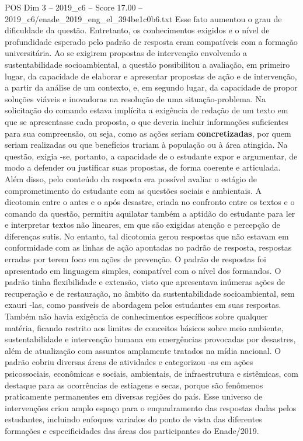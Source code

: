 \begin{textsample}{POS Dim 3 – 2019\_c6 – Score 17.00 – 2019\_c6/enade\_2019\_eng\_el\_394be1c0b6.txt}
Esse fato aumentou o grau de dificuldade da questão.
Entretanto, os conhecimentos exigidos e o nível de profundidade esperado pelo padrão de resposta eram compatíveis com a formação universitária.
Ao se exigirem propostas de intervenção envolvendo a sustentabilidade socioambiental, a questão possibilitou a avaliação, em primeiro lugar, da capacidade de elaborar e apresentar propostas de ação e de intervenção, a partir da análise de um contexto, e, em segundo lugar, da capacidade de propor soluções viáveis e inovadoras na resolução de uma situação-problema.
Na solicitação do comando estava implícita a exigência de redação de um texto em que se apresentasse cada proposta, o que deveria incluir informações suficientes para sua compreensão, ou seja, como as ações seriam \textbf{concretizadas}, por quem seriam realizadas ou que benefícios trariam à população ou à área atingida.
Na questão, exigia -se, portanto, a capacidade de o estudante expor e argumentar, de modo a defender ou justificar suas propostas, de forma coerente e articulada.
Além disso, pelo conteúdo da resposta era possível avaliar o estágio de comprometimento do estudante com as questões sociais e ambientais.
A dicotomia entre o antes e o após desastre, criada no confronto entre os textos e o comando da questão, permitiu aquilatar também a aptidão do estudante para ler e interpretar textos não lineares, em que são exigidas atenção e percepção de diferenças sutis.
No entanto, tal dicotomia gerou respostas que não estavam em conformidade com as linhas de ação apontadas no padrão de resposta, respostas erradas por terem foco em ações de prevenção.
O padrão de respostas foi apresentado em linguagem simples, compatível com o nível dos formandos.
O padrão tinha flexibilidade e extensão, visto que apresentava inúmeras ações de recuperação e de restauração, no âmbito da sustentabilidade socioambiental, sem exauri -las, como passíveis de abordagem pelos estudantes em suas respostas.
Também não havia exigência de conhecimentos específicos sobre qualquer matéria, ficando restrito aos limites de conceitos básicos sobre meio ambiente, sustentabilidade e intervenção humana em emergências provocadas por desastres, além de atualização com assuntos amplamente tratados na mídia nacional.
O padrão cobriu diversas áreas de atividades e categorizou -as em ações psicossociais, econômicas e sociais, ambientais, de infraestrutura e sistêmicas, com destaque para as ocorrências de estiagens e secas, porque são fenômenos praticamente permanentes em diversas regiões do país.
Esse universo de intervenções criou amplo espaço para o enquadramento das respostas dadas pelos estudantes, incluindo enfoques variados do ponto de vista das diferentes formações e especificidades das áreas dos participantes do Enade/2019.

\end{textsample}
